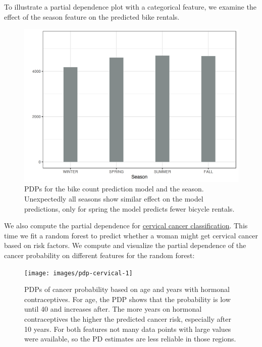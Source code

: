 \documentclass[
  12pt,
]{krantz}
\begin{document}
To illustrate a partial dependence plot with a categorical feature, we examine the effect of the season feature on the predicted bike rentals.

\begin{figure}

{\centering \includegraphics[width=\textwidth]{images/pdp-bike-cat-1} 

}

\caption{PDPs for the bike count prediction model and the season. Unexpectedly all seasons show similar effect on the model predictions, only for spring the model predicts fewer bicycle rentals.}\label{fig:pdp-bike-cat}
\end{figure}

We also compute the partial dependence for \protect\hyperlink{cervical}{cervical cancer classification}.
This time we fit a random forest to predict whether a woman might get cervical cancer based on risk factors.
We compute and visualize the partial dependence of the cancer probability on different features for the random forest:

\begin{figure}

{\centering \texttt{[image: images/pdp-cervical-1]} 

}

\caption{PDPs of cancer probability based on age and years with hormonal contraceptives. For age, the PDP shows that the probability is low until 40 and increases after. The more years on hormonal contraceptives the higher the predicted cancer risk, especially after 10 years. For both features not many data points with large values were available, so the PD estimates are less reliable in those regions.}\label{fig:pdp-cervical}
\end{figure}
\end{document}
